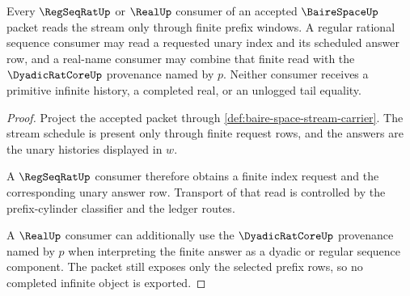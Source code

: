 \begin{theorem}
\label{thm:baire-space-real-name-handoff}
Every $\RegSeqRatUp$ or $\RealUp$ consumer of an accepted $\BaireSpaceUp$
packet reads the stream only through finite prefix windows. A regular rational
sequence consumer may read a requested unary index and its scheduled answer
row, and a real-name consumer may combine that finite read with the
$\DyadicRatCoreUp$ provenance named by $p$. Neither consumer receives a
primitive infinite history, a completed real, or an unlogged tail equality.
\end{theorem}
\begin{proof}
Project the accepted packet through
\autoref{def:baire-space-stream-carrier}. The stream schedule is present only
through finite request rows, and the answers are the unary histories displayed
in $w$.

A $\RegSeqRatUp$ consumer therefore obtains a finite index request and the
corresponding unary answer row. Transport of that read is controlled by the
prefix-cylinder classifier and the ledger routes.

A $\RealUp$ consumer can additionally use the $\DyadicRatCoreUp$ provenance
named by $p$ when interpreting the finite answer as a dyadic or regular
sequence component. The packet still exposes only the selected prefix rows, so
no completed infinite object is exported.
\end{proof}

